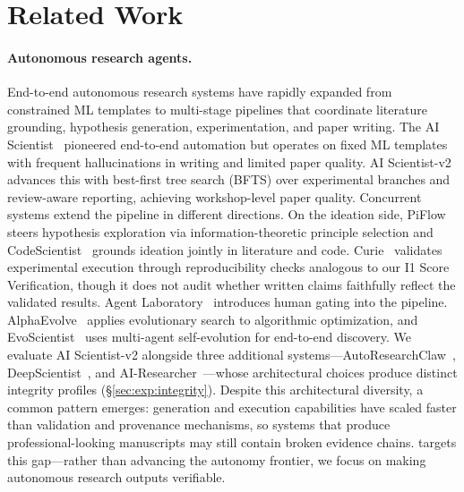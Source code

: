\section{Related Work}
\label{sec:related}

\paragraph{Autonomous research agents.}
End-to-end autonomous research systems have rapidly expanded from constrained ML templates to multi-stage pipelines that coordinate literature grounding, hypothesis generation, experimentation, and paper writing.
The AI Scientist~\citep{lu2024aiscientist} pioneered end-to-end automation but operates on fixed ML templates with frequent hallucinations in writing and limited paper quality.
AI Scientist-v2~\citep{yamada2025aiscientistv2} advances this with best-first tree search (BFTS) over experimental branches and review-aware reporting, achieving workshop-level paper quality.
Concurrent systems extend the pipeline in different directions.
On the ideation side, PiFlow~\citep{wu2025piflow} steers hypothesis exploration via information-theoretic principle selection and CodeScientist~\citep{jansen2025codescientist} grounds ideation jointly in literature and code.
Curie~\citep{kon2025curie} validates experimental execution through reproducibility checks analogous to our I1 Score Verification, though it does not audit whether written claims faithfully reflect the validated results.
Agent Laboratory~\citep{schmidgall2025agentlab} introduces human gating into the pipeline. AlphaEvolve~\citep{novikov2025alphaevolve} applies evolutionary search to algorithmic optimization, and EvoScientist~\citep{li2026evoscientist} uses multi-agent self-evolution for end-to-end discovery.
We evaluate AI Scientist-v2 alongside three additional systems---AutoResearchClaw~\citep{li2024autoresearchclaw}, DeepScientist~\citep{huang2025deepscientist}, and AI-Researcher~\citep{tang2025airesearcher}---whose architectural choices produce distinct integrity profiles (\S\ref{sec:exp:integrity}).
Despite this architectural diversity, a common pattern emerges: generation and execution capabilities have scaled faster than validation and provenance mechanisms, so systems that produce professional-looking manuscripts may still contain broken evidence chains.
\sys{} targets this gap---rather than advancing the autonomy frontier, we focus on making autonomous research outputs verifiable.


